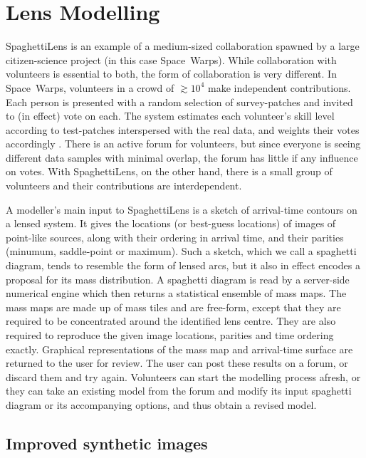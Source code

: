 \documentclass[fleqn,usenatbib]{mnras}
\begin{document}
\section{Lens Modelling}\label{sec:spl}

SpaghettiLens is an example of a medium-sized collaboration spawned by
a large citizen-science project (in this case Space~Warps).  While
collaboration with volunteers is essential to both, the form of
collaboration is very different.  In Space~Warps, volunteers in a
crowd of $\gtrsim10^4$ make independent contributions.  Each person is
presented with a random selection of survey-patches and invited to (in
effect) vote on each.  The system estimates each volunteer's skill
level according to test-patches interspersed with the real data, and
weights their votes accordingly \citep{2016MNRAS.455.1171M}.  There is
an active forum for volunteers, but since everyone is seeing different
data samples with minimal overlap, the forum has little if any
influence on votes.  With SpaghettiLens, on the other hand, there is a
small group of volunteers and their contributions are interdependent.

A modeller's main input to SpaghettiLens is a sketch of arrival-time
contours on a lensed system.  It gives the locations (or best-guess
locations) of images of point-like sources, along with their ordering
in arrival time, and their parities (minumum, saddle-point or
maximum).  Such a sketch, which we call a spaghetti diagram, tends to
resemble the form of lensed arcs, but it also in effect 
encodes a proposal for its mass distribution.  A spaghetti diagram is
read by a server-side numerical engine \citep[GLASS, developed
  by][]{2014MNRAS.445.2181C} which then returns a statistical ensemble
of mass maps.  The mass maps are made up of mass tiles and are
free-form, except that they are required to be concentrated around the
identified lens centre.  They are also required to reproduce the given
image locations, parities and time ordering exactly.  Graphical
representations of the mass map and arrival-time surface are returned
to the user for review.  The user can post these results on a forum,
or discard them and try again.  Volunteers can start the modelling
process afresh, or they can take an existing model from the forum and
modify its input spaghetti diagram or its accompanying options, and
thus obtain a revised model.

\subsection{Improved synthetic images}\label{subsec:sourcefit}
\end{document}
